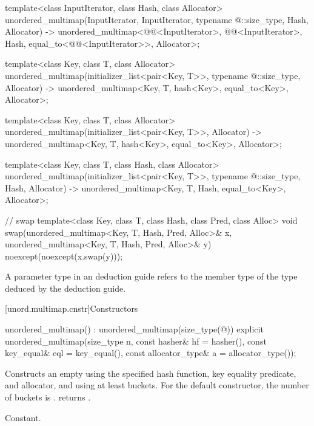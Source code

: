 \begin{codeblock}
{  template<class InputIterator, class Hash, class Allocator>
    unordered_multimap(InputIterator, InputIterator, typename @\seebelow@::size_type, Hash,
                       Allocator)
      -> unordered_multimap<@@<InputIterator>, @@<InputIterator>, Hash,
                            equal_to<@@<InputIterator>>, Allocator>;

  template<class Key, class T, class Allocator>
    unordered_multimap(initializer_list<pair<Key, T>>, typename @\seebelow@::size_type,
                       Allocator)
      -> unordered_multimap<Key, T, hash<Key>, equal_to<Key>, Allocator>;

  template<class Key, class T, class Allocator>
    unordered_multimap(initializer_list<pair<Key, T>>, Allocator)
      -> unordered_multimap<Key, T, hash<Key>, equal_to<Key>, Allocator>;

  template<class Key, class T, class Hash, class Allocator>
    unordered_multimap(initializer_list<pair<Key, T>>, typename @\seebelow@::size_type,
                       Hash, Allocator)
      -> unordered_multimap<Key, T, Hash, equal_to<Key>, Allocator>;

  // swap
  template<class Key, class T, class Hash, class Pred, class Alloc>
    void swap(unordered_multimap<Key, T, Hash, Pred, Alloc>& x,
              unordered_multimap<Key, T, Hash, Pred, Alloc>& y)
      noexcept(noexcept(x.swap(y)));
}
\end{codeblock}

\pnum
A  parameter type in an  deduction guide
refers to the  member type of the type deduced by the deduction guide.

[unord.multimap.cnstr]{Constructors}

%
\begin{itemdecl}
unordered_multimap() : unordered_multimap(size_type(@\seebelow@)) { }
explicit unordered_multimap(size_type n,
                            const hasher& hf = hasher(),
                            const key_equal& eql = key_equal(),
                            const allocator_type& a = allocator_type());
\end{itemdecl}

\begin{itemdescr}
\pnum
\effects Constructs an empty  using the
specified hash function, key equality predicate, and allocator, and
using at least  buckets.  For the default constructor,
the number of buckets is .
 returns .

\pnum
\complexity Constant.
\end{itemdescr}


